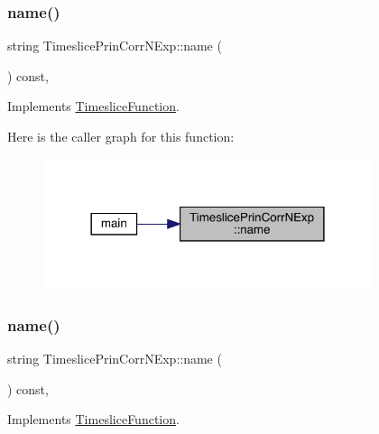 \subsubsection{\texorpdfstring{name()}{name()}\hspace{0.1cm}{\footnotesize\ttfamily [1/2]}}
{\footnotesize\ttfamily string Timeslice\+Prin\+Corr\+N\+Exp\+::name (\begin{DoxyParamCaption}{ }\end{DoxyParamCaption}) const\hspace{0.3cm}{\ttfamily [inline]}, {\ttfamily [virtual]}}



Implements \mbox{\hyperlink{classTimesliceFunction_addfcdb96287c354039a1536879cfe787}{Timeslice\+Function}}.

Here is the caller graph for this function\+:
\nopagebreak
\begin{figure}[H]
\begin{center}
\leavevmode
\includegraphics[width=273pt]{d8/df8/classTimeslicePrinCorrNExp_a02d5af4384f14f17322e865c882c5b15_icgraph}
\end{center}
\end{figure}
\mbox{\label{classTimeslicePrinCorrNExp_a02d5af4384f14f17322e865c882c5b15}} 
\subsubsection{\texorpdfstring{name()}{name()}\hspace{0.1cm}{\footnotesize\ttfamily [2/2]}}
{\footnotesize\ttfamily string Timeslice\+Prin\+Corr\+N\+Exp\+::name (\begin{DoxyParamCaption}{ }\end{DoxyParamCaption}) const\hspace{0.3cm}{\ttfamily [inline]}, {\ttfamily [virtual]}}



Implements \mbox{\hyperlink{classTimesliceFunction_addfcdb96287c354039a1536879cfe787}{Timeslice\+Function}}.

